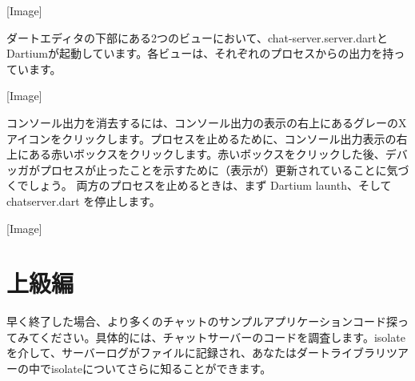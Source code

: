 [Image]

ダートエディタの下部にある2つのビューにおいて、chat-server.server.dartとDartiumが起動しています。各ビューは、それぞれのプロセスからの出力を持っています。

[Image]

コンソール出力を消去するには、コンソール出力の表示の右上にあるグレーのXアイコンをクリックします。プロセスを止めるために、コンソール出力表示の右上にある赤いボックスをクリックします。赤いボックスをクリックした後、デバッガがプロセスが止ったことを示すために（表示が）更新されていることに気づくでしょう。
両方のプロセスを止めるときは、まず Dartium launth、そして chatserver.dart を停止します。

[Image]

\section{上級編}

早く終了した場合、より多くのチャットのサンプルアプリケーションコード探ってみてください。具体的には、チャットサーバーのコードを調査します。isolateを介して、サーバーログがファイルに記録され、あなたはダートライブラリツアーの中でisolateについてさらに知ることができます。

\clearpage
